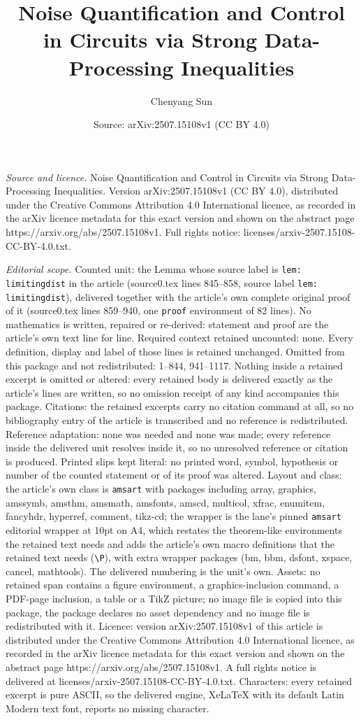 \documentclass[10pt,a4paper]{amsart}
\title[Noise Quantification and Control in Circuits via Strong Data]{Noise Quantification and Control in Circuits via Strong Data-Processing Inequalities}
\author{Chenyang Sun}
\date{Source: arXiv:2507.15108v1 (CC BY 4.0)}
\begin{document}
\maketitle

\noindent\emph{Source and licence.} Noise Quantification and Control in Circuits via Strong Data-Processing Inequalities. Version arXiv:2507.15108v1 (CC BY 4.0), distributed under the Creative Commons Attribution 4.0 International licence, as recorded in the arXiv licence metadata for this exact version and shown on the abstract page https://arxiv.org/abs/2507.15108v1. Full rights notice: licenses/arxiv-2507.15108-CC-BY-4.0.txt.\par\smallskip

\noindent\textit{Editorial scope.} Counted unit: the Lemma whose source label is \texttt{lem: limitingdist} in the article (source0.tex lines 845--858, source label \texttt{lem: limitingdist}), delivered together with the article's own complete original proof of it (source0.tex lines 859--940, one \texttt{proof} environment of 82 lines). No mathematics is written, repaired or re-derived: statement and proof are the article's own text line for line. Required context retained uncounted: none. Every definition, display and label of those lines is retained unchanged. Omitted from this package and not redistributed: 1--844, 941--1117. Nothing inside a retained excerpt is omitted or altered: every retained body is delivered exactly as the article's lines are written, so no omission receipt of any kind accompanies this package. Citations: the retained excerpts carry no citation command at all, so no bibliography entry of the article is transcribed and no reference is redistributed. Reference adaptation: none was needed and none was made; every reference inside the delivered unit resolves inside it, so no unresolved reference or citation is produced. Printed slips kept literal: no printed word, symbol, hypothesis or number of the counted statement or of its proof was altered. Layout and class: the article's own class is \texttt{amsart} with packages including array, graphics, amssymb, amsthm, amsmath, amsfonts, amscd, multicol, xfrac, enumitem, fancyhdr, hyperref, comment, tikz-cd; the wrapper is the lane's pinned \texttt{amsart} editorial wrapper at 10pt on A4, which restates the theorem-like environments the retained text needs and adds the article's own macro definitions that the retained text needs (\texttt{\textbackslash P}), with extra wrapper packages (bm, bbm, dsfont, xspace, cancel, mathtools). The delivered numbering is the unit's own. Assets: no retained span contains a figure environment, a graphics-inclusion command, a PDF-page inclusion, a table or a TikZ picture; no image file is copied into this package, the package declares no asset dependency and no image file is redistributed with it. Licence: version arXiv:2507.15108v1 of this article is distributed under the Creative Commons Attribution 4.0 International licence, as recorded in the arXiv licence metadata for this exact version and shown on the abstract page https://arxiv.org/abs/2507.15108v1. A full rights notice is delivered at licenses/arxiv-2507.15108-CC-BY-4.0.txt. Characters: every retained excerpt is pure ASCII, so the delivered engine, XeLaTeX with its default Latin Modern text font, reports no missing character.
\end{document}
